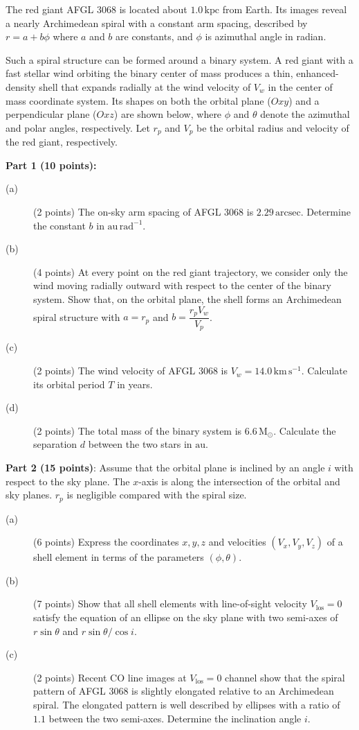 The red giant AFGL 3068 is located about $1.0\,\mathrm{kpc}$ from Earth. Its
images reveal a nearly Archimedean spiral with a constant arm spacing,
described by $r = a + b\phi$ where $a$ and $b$ are constants, and $\phi$ is
azimuthal angle in radian.


Such a spiral structure can be formed around a binary system. A red giant with
a fast stellar wind orbiting the binary center of mass produces a thin,
enhanced-density shell that expands radially at the wind velocity of $V_w$ in
the center of mass coordinate system. Its shapes on both the orbital plane
($Oxy$) and a perpendicular plane ($Oxz$) are shown below, where $\phi$ and
$\theta$ denote the azimuthal and polar angles, respectively. Let $r_p$ and
$V_p$ be the orbital radius and velocity of the red giant, respectively.


\medskip\noindent\textbf{Part 1 (10 points):}

\begin{description}
\item[(a)] (2 points) The on-sky arm spacing of AFGL 3068 is
  $2.29\,\mathrm{arcsec}$. Determine the constant $b$ in
  $\mathrm{au\,rad^{-1}}$.
\item[(b)] (4 points) At every point on the red giant trajectory, we consider
  only the wind moving radially outward with respect to the center of the
  binary system. Show that, on the orbital plane, the shell forms an
  Archimedean spiral structure with $a = r_p$ and $b = \dfrac{r_p V_w}{V_p}$.
\item[(c)] (2 points) The wind velocity of AFGL 3068 is
  $V_w = 14.0\,\mathrm{km\,s^{-1}}$. Calculate its orbital period $T$ in
  years.
\item[(d)] (2 points) The total mass of the binary system is
  $6.6\,\mathrm{M}_\odot$. Calculate the separation $d$ between the two stars
  in $\mathrm{au}$.
\end{description}

\medskip\noindent\textbf{Part 2 (15 points)}: Assume that the orbital plane is
inclined by an angle $i$ with respect to the sky plane. The $x$-axis is along
the intersection of the orbital and sky planes. $r_p$ is negligible compared
with the spiral size.

\begin{description}
\item[(a)] (6 points) Express the coordinates $x, y, z$ and velocities
  $(V_x, V_y, V_z)$ of a shell element in terms of the parameters
  $(\phi, \theta)$.
\item[(b)] (7 points) Show that all shell elements with line-of-sight velocity
  $V_{\mathrm{los}} = 0$ satisfy the equation of an ellipse on the sky plane
  with two semi-axes of $r\sin\theta$ and $r\sin\theta/\cos i$.
\item[(c)] (2 points) Recent CO line images at $V_{\mathrm{los}} = 0$ channel
  show that the spiral pattern of AFGL 3068 is slightly elongated relative to
  an Archimedean spiral. The elongated pattern is well described by ellipses
  with a ratio of $1.1$ between the two semi-axes. Determine the inclination
  angle $i$.
\end{description}
